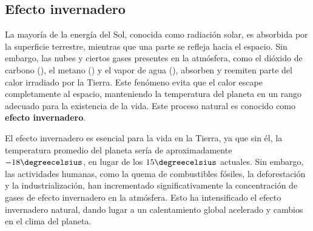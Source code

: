 \subsection{Efecto invernadero}\label{cinver}
La mayoría de la energía del Sol, conocida como radiación solar, es absorbida por la superficie terrestre, mientras que una parte se refleja hacia el espacio. Sin embargo, las nubes y ciertos gases presentes en la atmósfera, como el dióxido de carbono (), el metano () y el vapor de agua (), absorben y reemiten parte del calor irradiado por la Tierra. Este fenómeno evita que el calor escape completamente al espacio, manteniendo la temperatura del planeta en un rango adecuado para la existencia de la vida. Este proceso natural es conocido como \textbf{efecto invernadero}.

El efecto invernadero es esencial para la vida en la Tierra, ya que sin él, la temperatura promedio del planeta sería de aproximadamente $-18\degreecelsius$, en lugar de los $15\degreecelsius$ actuales. Sin embargo, las actividades humanas, como la quema de combustibles fósiles, la deforestación y la industrialización, han incrementado significativamente la concentración de gases de efecto invernadero en la atmósfera. Esto ha intensificado el efecto invernadero natural, dando lugar a un calentamiento global acelerado y cambios en el clima del planeta. 

